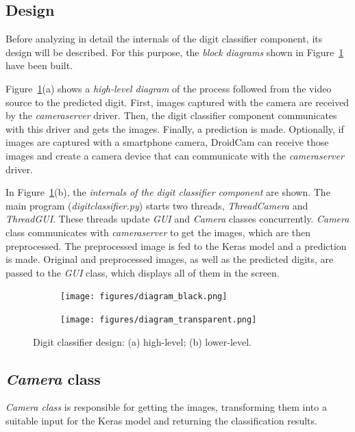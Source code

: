 \subsection{Design}
Before analyzing in detail the internals of the digit classifier component, its design will be described. For this purpose, the \emph{block diagrams} shown in Figure~\ref{fig:dia} have been built.

Figure~\ref{fig:dia}(a) shows a \emph{high-level diagram} of the process followed from the video source to the predicted digit. First, images captured with the camera are received by the \emph{cameraserver} driver. Then, the digit classifier component communicates with this driver and gets the images. Finally, a prediction is made. Optionally, if images are captured with a smartphone camera, DroidCam can receive those images and create a camera device that can communicate with the \emph{cameraserver} driver.

In Figure~\ref{fig:dia}(b), the  \emph{internals of the digit classifier component} are shown. The main program (\emph{digitclassifier.py}) starts two threads, \textit{ThreadCamera} and \textit{ThreadGUI}. These threads update \textit{GUI} and \textit{Camera} classes concurrently. \textit{Camera} class communicates with \textit{cameraserver} to get the images, which are then preprocessed. The preprocessed image is fed to the Keras model and a prediction is made. Original and preprocessed images, as well as the predicted digits, are passed to the \textit{GUI} class, which displays all of them in the screen.
\begin{figure}
	\begin{subfigure}{1\textwidth}
		\centering
		\texttt{[image: figures/diagram\_black.png]}
		\caption{}
	\end{subfigure}
	\begin{subfigure}{1\textwidth}
		\centering
		\texttt{[image: figures/diagram\_transparent.png]}
		\caption{}
	\end{subfigure}
	\caption{Digit classifier design: (a) high-level; (b) lower-level.}
	\label{fig:dia}
\end{figure}

\subsection{\textit{Camera} class}
\emph{\textit{Camera} class} is responsible for getting the images, transforming them into a suitable input for the Keras model and returning the classification results.

